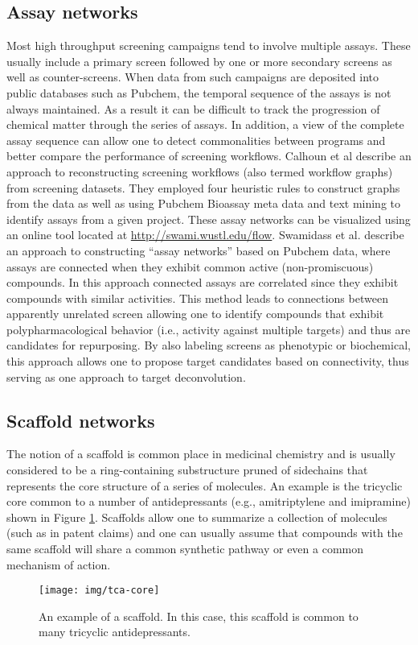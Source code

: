 \documentclass[]{book}
\begin{document}
\subsection{Assay networks}
\label{sec:assay-networks}

Most high throughput screening campaigns tend to involve multiple
assays. These usually include a primary screen followed by one or more
secondary screens as well as counter-screens. When data from such
campaigns are deposited into public databases such as Pubchem, the
temporal sequence of the assays is not always maintained. As a result
it can be difficult to track the progression of chemical matter
through the series of assays. In addition, a view of the complete
assay sequence can allow one to detect commonalities between programs
and better compare the performance of screening workflows. Calhoun et
al \cite{Calhoun:2012uq} describe an approach to reconstructing
screening workflows (also termed workflow graphs) from screening
datasets. They employed four heuristic rules to construct graphs from
the data as well as using Pubchem Bioassay meta data and text mining
to identify assays from a given project. These assay networks can be
visualized using an online tool located at
\href{http://swami.wustl.edu/flow}{http://swami.wustl.edu/flow}.
Swamidass et al. \cite{Swamidass:2014vn} describe an approach to
constructing ``assay networks'' based on Pubchem data, where assays
are connected when they exhibit common active (non-promiscuous)
compounds. In this approach connected assays are correlated since they
exhibit compounds with similar activities. This method leads to
connections between apparently unrelated screen allowing one to
identify compounds that exhibit polypharmacological behavior (i.e.,
activity against multiple targets) and thus are candidates for
repurposing. By also labeling screens as phenotypic or biochemical,
this approach allows one to propose target candidates based on
connectivity, thus serving as one approach to target deconvolution.

\subsection{Scaffold networks}
\label{sec:scaffold-networks}

The notion of a scaffold is common place in medicinal chemistry and is
usually considered to be a ring-containing substructure pruned of
sidechains that represents the core structure of a series of
molecules. An example is the tricyclic core common to a number of
antidepressants (e.g., amitriptylene and imipramine) shown in Figure
\ref{fig:tca-core}. Scaffolds allow one to summarize a collection of
molecules (such as in patent claims) and one can usually assume that
compounds with the same scaffold will share a common synthetic pathway
or even a common mechanism of action.
\begin{figure}[h]
  \centering
  \texttt{[image: img/tca-core]}
  \caption{An example of a scaffold. In this case, this
  scaffold is common to many tricyclic antidepressants.}
  \label{fig:tca-core}
\end{figure}
\end{document}
